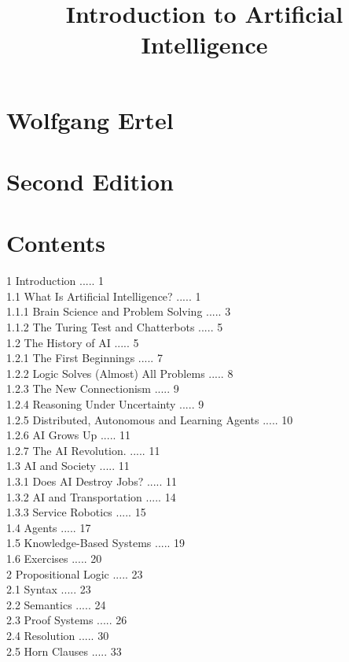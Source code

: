 \documentclass[10pt]{article}
\title{Introduction to Artificial Intelligence }
\author{}
\date{}
\begin{document}
\maketitle
\captionsetup{singlelinecheck=false}
\section*{Wolfgang Ertel}
\section*{Second Edition}
\section*{Contents}
1 Introduction ..... 1\\
1.1 What Is Artificial Intelligence? ..... 1\\
1.1.1 Brain Science and Problem Solving ..... 3\\
1.1.2 The Turing Test and Chatterbots ..... 5\\
1.2 The History of AI ..... 5\\
1.2.1 The First Beginnings ..... 7\\
1.2.2 Logic Solves (Almost) All Problems ..... 8\\
1.2.3 The New Connectionism ..... 9\\
1.2.4 Reasoning Under Uncertainty ..... 9\\
1.2.5 Distributed, Autonomous and Learning Agents ..... 10\\
1.2.6 AI Grows Up ..... 11\\
1.2.7 The AI Revolution. ..... 11\\
1.3 AI and Society ..... 11\\
1.3.1 Does AI Destroy Jobs? ..... 11\\
1.3.2 AI and Transportation ..... 14\\
1.3.3 Service Robotics ..... 15\\
1.4 Agents ..... 17\\
1.5 Knowledge-Based Systems ..... 19\\
1.6 Exercises ..... 20\\
2 Propositional Logic ..... 23\\
2.1 Syntax ..... 23\\
2.2 Semantics ..... 24\\
2.3 Proof Systems ..... 26\\
2.4 Resolution ..... 30\\
2.5 Horn Clauses ..... 33\\
\end{document}
